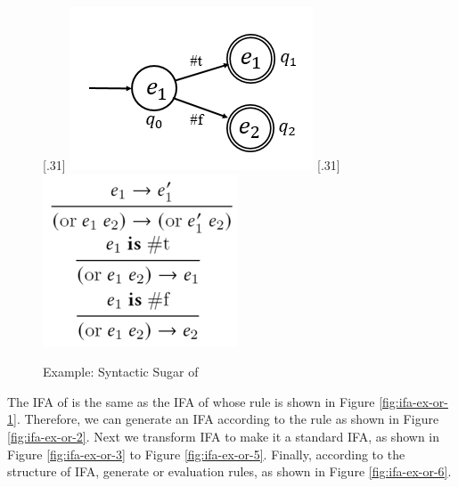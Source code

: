 \begin{figure}[t]
{    }
    [.31\linewidth]{
        \includegraphics[scale=0.3]{images/ifa-ex-or-5.png}
    }
    [.31\linewidth]{
        \includegraphics[scale=0.3]{images/ifa-ex-or-6.png}
    }
    \caption{Example: Syntactic Sugar of }
    \label{fig:ifa-nand-std}
\end{figure}

The IFA of  is the same as the IFA of  whose rule is shown in Figure \ref{fig:ifa-ex-or-1}. Therefore, we can generate an IFA according to the rule as shown in Figure \ref{fig:ifa-ex-or-2}. Next we transform IFA to make it a standard IFA, as shown in Figure \ref{fig:ifa-ex-or-3} to Figure \ref{fig:ifa-ex-or-5}. Finally, according to the structure of IFA, generate or evaluation rules, as shown in Figure \ref{fig:ifa-ex-or-6}.

